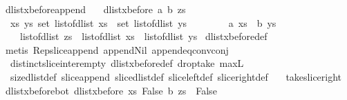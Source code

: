 \begin{isabellebody}
\endisatagproof
{\isafoldproof}%
%
\isadelimproof
\isanewline
%
\endisadelimproof
\isanewline
{}\isamarkupfalse%
\ dlist{\isacharunderscore}xbefore{\isacharunderscore}append{\isacharcolon}\ \isanewline
\ \ {\isachardoublequoteopen}dlist{\isacharunderscore}xbefore\ a\ b\ zs\ {\isasymlongleftrightarrow}\ \isanewline
\ \ {\isacharparenleft}{\isasymexists}xs\ ys{\isachardot}\ set\ {\isacharparenleft}list{\isacharunderscore}of{\isacharunderscore}dlist\ xs{\isacharparenright}\ {\isasyminter}\ set\ {\isacharparenleft}list{\isacharunderscore}of{\isacharunderscore}dlist\ ys{\isacharparenright}\ {\isacharequal}\ \isanewline
\ \ \ \ {\isacharbraceleft}{\isacharbraceright}\ {\isasymand}\ a\ xs\ {\isasymand}\ b\ ys\ {\isasymand}\ \isanewline
\ \ \ \ list{\isacharunderscore}of{\isacharunderscore}dlist\ zs\ {\isacharequal}\ {\isacharparenleft}{\isacharparenleft}list{\isacharunderscore}of{\isacharunderscore}dlist\ xs{\isacharparenright}\ {\isacharat}\ {\isacharparenleft}list{\isacharunderscore}of{\isacharunderscore}dlist\ ys{\isacharparenright}{\isacharparenright}{\isacharparenright}{\isachardoublequoteclose}\isanewline
%
\isadelimproof
%
\endisadelimproof
%
\isatagproof
{}\isamarkupfalse%
\ dlist{\isacharunderscore}xbefore{\isacharunderscore}def\isanewline
{}\isamarkupfalse%
\ {\isacharparenleft}metis\ Rep{\isacharunderscore}slice{\isacharunderscore}append\ append{\isacharunderscore}Nil{}\ append{\isacharunderscore}eq{\isacharunderscore}conv{\isacharunderscore}conj\ \isanewline
\ \ distinct{\isacharunderscore}slice{\isacharunderscore}inter{\isacharunderscore}empty\ dlist{\isacharunderscore}xbefore{\isacharunderscore}def\ drop{\isacharunderscore}take\ max{\isacharunderscore}{}L\ \isanewline
\ \ size{\isacharunderscore}dlist{\isacharunderscore}def\ slice{\isacharunderscore}append\ slice{\isacharunderscore}dlist{\isacharunderscore}def\ slice{\isacharunderscore}left{\isacharunderscore}def\ slice{\isacharunderscore}right{\isacharunderscore}def\ \isanewline
\ \ take{\isacharunderscore}slice{\isacharunderscore}right{\isacharparenright}%
\endisatagproof
{\isafoldproof}%
%
\isadelimproof
%
\endisadelimproof
%
\isamarkuptrue%
\isamarkupfalse%
\ dlist{\isacharunderscore}xbefore{\isacharunderscore}bot{\isacharunderscore}{}{\isacharcolon}\ {\isachardoublequoteopen}dlist{\isacharunderscore}xbefore\ {\isacharparenleft}{\isasymlambda}xs{\isachardot}\ False{\isacharparenright}\ b\ zs\ {\isacharequal}\ False{\isachardoublequoteclose}\isanewline

\end{isabellebody}
